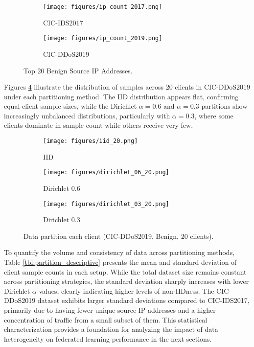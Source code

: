 \begin{figure}[h]
    \centering

    \begin{subfigure}[b]{0.49\textwidth}
        \centering
        \texttt{[image: figures/ip\_count\_2017.png]}
        \caption{CIC-IDS2017}
        \label{fig:src_ip_count_2017}
    \end{subfigure}
    \hfill
    \begin{subfigure}[b]{0.49\textwidth}
        \centering
        \texttt{[image: figures/ip\_count\_2019.png]}
        \caption{CIC-DDoS2019}
        \label{fig:src_ip_count_2019}
    \end{subfigure}

    \caption{Top 20 Benign Source IP Addresses.}
\end{figure}

Figures \ref{fig:partition_distributions} illustrate the distribution of samples across 20 clients in CIC-DDoS2019 under each partitioning method. The IID distribution appears flat, confirming equal client sample sizes, while the Dirichlet $\alpha=0.6$ and $\alpha=0.3$ partitions show increasingly unbalanced distributions, particularly with $\alpha=0.3$, where some clients dominate in sample count while others receive very few.

\begin{figure}[h]
    \centering

    \begin{subfigure}[b]{0.32\textwidth}
        \centering
        \texttt{[image: figures/iid\_20.png]}
        \caption{IID}
    \end{subfigure}
    \hfill
    \begin{subfigure}[b]{0.32\textwidth}
        \centering
        \texttt{[image: figures/dirichlet\_06\_20.png]}
        \caption{Dirichlet 0.6}
    \end{subfigure}
    \hfill
    \begin{subfigure}[b]{0.32\textwidth}
        \centering
        \texttt{[image: figures/dirichlet\_03\_20.png]}
        \caption{Dirichlet 0.3}
    \end{subfigure}

    \caption{Data partition each client (CIC-DDoS2019, Benign, 20 clients).}
    \label{fig:partition_distributions}
\end{figure}


To quantify the volume and consistency of data across partitioning methods, Table \ref{tbl:partition_descriptive} presents the mean and standard deviation of client sample counts in each setup. While the total dataset size remains constant across partitioning strategies, the standard deviation sharply increases with lower Dirichlet $\alpha$ values, clearly indicating higher levels of non-IIDness. The CIC-DDoS2019 dataset exhibits larger standard deviations compared to CIC-IDS2017, primarily due to having fewer unique source IP addresses and a higher concentration of traffic from a small subset of them. This statistical characterization provides a foundation for analyzing the impact of data heterogeneity on federated learning performance in the next sections.

